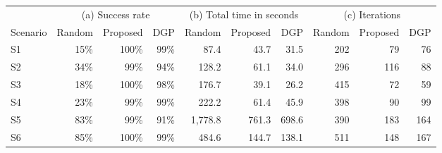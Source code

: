 \begin{tabular}{lrrrrrrrrr}
\toprule
 & \multicolumn{3}{c}{(a) Success rate} & \multicolumn{3}{c}{(b) Total time in seconds} & \multicolumn{3}{c}{(c) Iterations} \\
\cmidrule(lr){2-4} \cmidrule(lr){5-7} \cmidrule(lr){8-10}
Scenario & Random & Proposed & DGP & Random & Proposed & DGP & Random & Proposed & DGP \\
\midrule
S1 & 15\% & 100\% & 99\% & 87.4 & 43.7 & 31.5 & 202 & 79 & 76 \\
S2 & 34\% & 99\% & 94\% & 128.2 & 61.1 & 34.0 & 296 & 116 & 88 \\
S3 & 18\% & 100\% & 98\% & 176.7 & 39.1 & 26.2 & 415 & 72 & 59 \\
S4 & 23\% & 99\% & 99\% & 222.2 & 61.4 & 45.9 & 398 & 90 & 99 \\
S5 & 83\% & 99\% & 91\% & 1,778.8 & 761.3 & 698.6 & 390 & 183 & 164 \\
S6 & 85\% & 100\% & 99\% & 484.6 & 144.7 & 138.1 & 511 & 148 & 167 \\
\bottomrule
\end{tabular}
